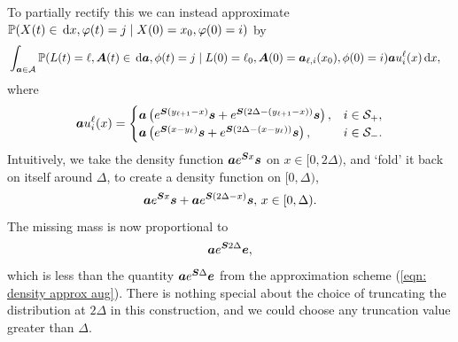 To partially rectify this we can instead approximate \(\mathbb P(X(t)\in \, \mathrm{d} x  , \varphi(t) = j\mid X(0)=x_0, \varphi(0) = i) \) by
\begin{align}
	\label{eqn: density approx 3+}&
		\displaystyle\int_{\boldsymbol a \in\mathcal A}\mathbb P(L(t) = \ell, \boldsymbol A(t)\in\, \mathrm{d} \boldsymbol a,\phi(t) = j\mid L(0)=\ell_0, \boldsymbol A(0) = \boldsymbol  a_{\ell,i}(x_0), \phi(0) = i) \boldsymbol a u_i^\ell(x) \, \mathrm{d} x ,
\end{align}
{where}
\begin{align}
		\boldsymbol a u_i^\ell(x) = \begin{cases}
			\boldsymbol a \left(e^{ \boldsymbol{S}(y_{\ell+1}-x)} \boldsymbol s + e^{ \boldsymbol{S}(2\Delta-(y_{\ell+1}-x))} \boldsymbol s\right), & i\in\mathcal{S}_+, \\ 
			\boldsymbol a \left(e^{ \boldsymbol{S}(x-y_\ell)} \boldsymbol s+e^{ \boldsymbol{S}(2\Delta-(x-y_\ell))} \boldsymbol s\right), & i\in\mathcal{S}_-. \\ 
		\end{cases}\label{eqn: density approx 3+a}
\end{align}
Intuitively, we take the density function \(\boldsymbol ae^{\boldsymbol{S}x}\boldsymbol s\) on \(x \in [0,2\Delta)\), and `fold' it back on itself around \(\Delta\), to create a density function on \([0,\Delta)\), 
\[\boldsymbol ae^{\boldsymbol{S}x}\boldsymbol s +\boldsymbol ae^{\boldsymbol{S}(2\Delta-x)}\boldsymbol s,\, x \in [0,\Delta).\]
The missing mass is now proportional to 
\[\boldsymbol a e^{\boldsymbol S 2\Delta}\boldsymbol e,\]
which is less than the quantity \(\boldsymbol a e^{\boldsymbol S \Delta}\boldsymbol e\) from the approximation scheme (\ref{eqn: density approx aug}). There is nothing special about the choice of truncating the distribution at \(2\Delta\) in this construction, and we could choose any truncation value greater than \(\Delta\).

